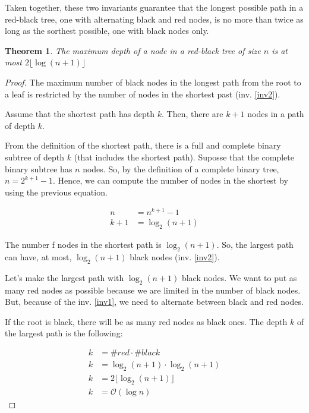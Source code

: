 \documentclass[12pt, a4paper]{article} %
\newtheorem{theorem}{Theorem}[section]
\begin{document}
Taken together, these two invariants guarantee that the longest possible path in a red-black tree, one with alternating black and red nodes, is no more than twice as long as the sorthest possible, one with black nodes only.

\begin{theorem}\label{t:balance}
  The maximum depth of a node in a red-black tree of size $n$ is at most $2\lfloor \log (n+1) \rfloor$
\end{theorem}

\begin{proof}\label{p:balance}
  The maximum number of black nodes in the longest path from the root to a leaf is restricted by the number of nodes in the shortest past (inv. \ref{inv2}).

  Assume that the shortest path has depth $k$. Then, there are $k+1$ nodes in a path of depth $k$.

  From the definition of the shortest path, there is a full and complete binary subtree of depth $k$ (that includes the shortest path). Suposse that the complete binary subtree has $n$ nodes. So, by the definition of a complete binary tree, $n = 2^{k+1} -1$. Hence, we can compute the number of nodes in the shortest by using the previous equation.

  \begin{align*}
    n     &= n^{k+1}-1 \\
    k + 1 &= \log_2 (n+1)
  \end{align*}

  The number f nodes in the shortest path is $\log_2 (n+1)$. So, the largest path can have, at most, $\log_2 (n+1)$ black nodes (inv. \ref{inv2}).

  Let's make the largest path with $\log_2 (n+1)$ black nodes. We want to put as many red nodes as possible because we are limited in the number of black nodes. But, because of the inv. \ref{inv1}, we need to alternate between black and red nodes.

  If the root is black, there will be as many red nodes as black ones. The depth $k$ of the largest path is the following:

  \begin{align*}
    k &= \#red \cdot \#black \\
    k &= \log_2 (n+1) \cdot \log_2 (n+1) \\
    k &= 2\lfloor \log_2 (n+1) \rfloor \\
    k &= \mathcal{O}(\log n)
  \end{align*}

\end{proof}
\end{document}
